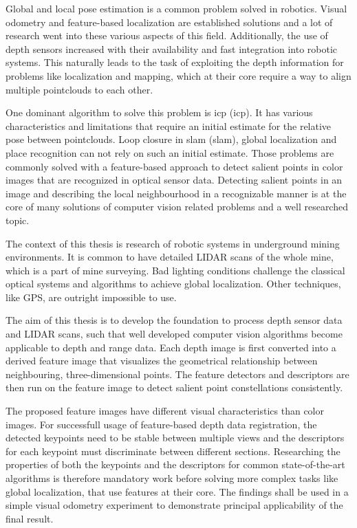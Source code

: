 Global and local pose estimation is a common problem solved in robotics.
Visual odometry\cite{he_tvc2019} and feature-based localization\cite{sattler_cvpr2018} are established solutions and a lot of research went into these various aspects of this field.
Additionally, the use of depth sensors increased with their availability and fast integration into robotic systems.
This naturally leads to the task of exploiting the depth information for problems like localization and mapping, which at their core require a way to align multiple pointclouds to each other.

One dominant algorithm to solve this problem is \acrshort{icp} (\acrlong{icp})\cite{besl_pami1992}.
It has various characteristics and limitations that require an initial estimate for the relative pose between pointclouds\cite{rusinkiewicz_ieee2001}.
Loop closure in \acrshort{slam} (\acrlong{slam})\cite{ho_ros2006}, global localization and place recognition\cite{sattler_2011} can not rely on such an initial estimate.
Those problems are commonly solved with a feature-based approach to detect salient points in color images that are recognized in optical sensor data.
Detecting salient points in an image and describing the local neighbourhood in a recognizable manner is at the core of many solutions of computer vision related problems and a well researched topic\cite{andersson_2016}.

The context of this thesis is research of robotic systems in underground mining environments.
It is common to have detailed \acrshort{LIDAR} scans of the whole mine, which is a part of mine surveying.
Bad lighting conditions challenge the classical optical systems and algorithms to achieve global localization.
Other techniques, like GPS, are outright impossible to use.

The aim of this thesis is to develop the foundation to process depth sensor data and \acrshort{LIDAR} scans, such that well developed computer vision algorithms become applicable to depth and range data.
Each depth image is first converted into a derived feature image that visualizes the geometrical relationship between neighbouring, three-dimensional points.
The feature detectors and descriptors are then run on the feature image to detect salient point constellations consistently.

The proposed feature images have different visual characteristics than color images.
For successfull usage of feature-based depth data registration, the detected keypoints need to be stable between multiple views and the descriptors for each keypoint must discriminate between different sections.
Researching the properties of both the keypoints and the descriptors for common state-of-the-art algorithms is therefore mandatory work before solving more complex tasks like global localization, that use features at their core.
The findings shall be used in a simple visual odometry experiment to demonstrate principal applicability of the final result.

